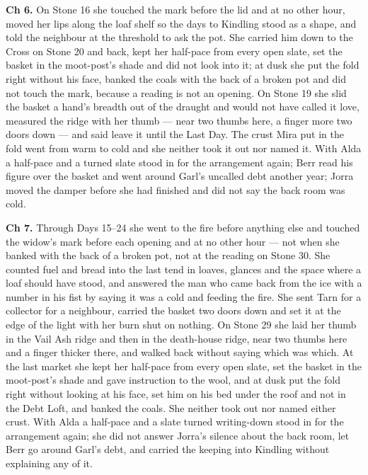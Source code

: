 \documentclass{design/chronicle}
\begin{document}
{\textbf{Ch 6.} On Stone 16 she touched the mark before the lid and at no other hour, moved her lips along the loaf shelf so the days to Kindling stood as a shape, and told the neighbour at the threshold to ask the pot. She carried him down to the Cross on Stone 20 and back, kept her half-pace from every open slate, set the basket in the moot-post’s shade and did not look into it; at dusk she put the fold right without his face, banked the coals with the back of a broken pot and did not touch the mark, because a reading is not an opening. On Stone 19 she slid the basket a hand’s breadth out of the draught and would not have called it love, measured the ridge with her thumb --- near two thumbs here, a finger more two doors down --- and said leave it until the Last Day. The crust Mira put in the fold went from warm to cold and she neither took it out nor named it. With Alda a half-pace and a turned slate stood in for the arrangement again; Berr read his figure over the basket and went around Garl’s uncalled debt another year; Jorra moved the damper before she had finished and did not say the back room was cold.

\textbf{Ch 7.} Through Days 15--24 she went to the fire before anything else and touched the widow’s mark before each opening and at no other hour --- not when she banked with the back of a broken pot, not at the reading on Stone 30. She counted fuel and bread into the last tend in loaves, glances and the space where a loaf should have stood, and answered the man who came back from the ice with a number in his fist by saying it was a cold and feeding the fire. She sent Tarn for a collector for a neighbour, carried the basket two doors down and set it at the edge of the light with her burn shut on nothing. On Stone 29 she laid her thumb in the Vail Ash ridge and then in the death-house ridge, near two thumbs here and a finger thicker there, and walked back without saying which was which. At the last market she kept her half-pace from every open slate, set the basket in the moot-post’s shade and gave instruction to the wool, and at dusk put the fold right without looking at his face, set him on his bed under the roof and not in the Debt Loft, and banked the coals. She neither took out nor named either crust. With Alda a half-pace and a slate turned writing-down stood in for the arrangement again; she did not answer Jorra’s silence about the back room, let Berr go around Garl’s debt, and carried the keeping into Kindling without explaining any of it.

}
\end{document}
